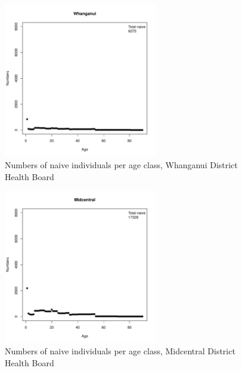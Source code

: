 \documentclass{article}
\begin{document}
\begin{figure}
     \begin{center}
     \includegraphics[width=0.6\textwidth]{dhb11.pdf}
     \end{center}
     \caption{Numbers of naive individuals per age class, Whanganui District Health Board}
     \label{fig:Whanganui}
\end{figure}

\begin{figure}
     \begin{center}
     \includegraphics[width=0.6\textwidth]{dhb12.pdf}
     \end{center}
     \caption{Numbers of naive individuals per age class, Midcentral District Health Board}
     \label{fig:Midcentral}
\end{figure}
\end{document}
